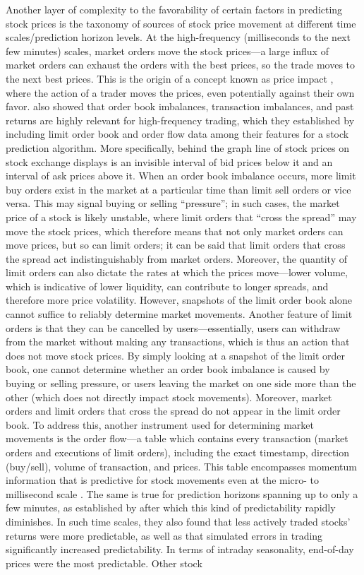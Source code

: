 \documentclass[stu,floatsintext]{apa7}
\begin{document}
Another layer of complexity to the favorability of certain factors in predicting stock prices is the taxonomy of sources of stock price movement at different time scales/prediction horizon levels. At the high-frequency (milliseconds to the next few minutes) scales, market orders move the stock prices—a large influx of market orders can exhaust the orders with the best prices, so the trade moves to the next best prices. This is the origin of a concept known as price impact \parencite{du2017what}, where the action of a trader moves the prices, even potentially against their own favor. \textcite{zaznov2024intraday} also showed that order book imbalances, transaction imbalances, and past returns are highly relevant for high-frequency trading, which they established by including limit order book and order flow data among their features for a stock prediction algorithm. More specifically, behind the graph line of stock prices on stock exchange displays is an invisible interval of bid prices below it and an interval of ask prices above it. When an order book imbalance occurs, more limit buy orders exist in the market at a particular time than limit sell orders or vice versa. This may signal buying or selling “pressure”; in such cases, the market price of a stock is likely unstable, where limit orders that “cross the spread” may move the stock prices, which therefore means that not only market orders can move prices, but so can limit orders; it can be said that limit orders that cross the spread act indistinguishably from market orders. Moreover, the quantity of limit orders can also dictate the rates at which the prices move—lower volume, which is indicative of lower liquidity, can contribute to longer spreads, and therefore more price volatility. However, snapshots of the limit order book alone cannot suffice to reliably determine market movements. Another feature of limit orders is that they can be cancelled by users—essentially, users can withdraw from the market without making any transactions, which is thus an action that does not move stock prices. By simply looking at a snapshot of the limit order book, one cannot determine whether an order book imbalance is caused by buying or selling pressure, or users leaving the market on one side more than the other (which does not directly impact stock movements). Moreover, market orders and limit orders that cross the spread do not appear in the limit order book. To address this, another instrument used for determining market movements is the order flow—a table which contains every transaction (market orders and executions of limit orders), including the exact timestamp, direction (buy/sell), volume of transaction, and prices. This table encompasses momentum information that is predictive for stock movements even at the micro- to millisecond scale \parencite{zaznov2024intraday}. The same is true for prediction horizons spanning up to only a few minutes, as established by \textcite{aitsahalia2022high} after which this kind of predictability rapidly diminishes. In such time scales, they also found that less actively traded stocks’ returns were more predictable, as well as that simulated errors in trading significantly increased predictability. In terms of intraday seasonality, end-of-day prices were the most predictable. Other stock 
\end{document}
